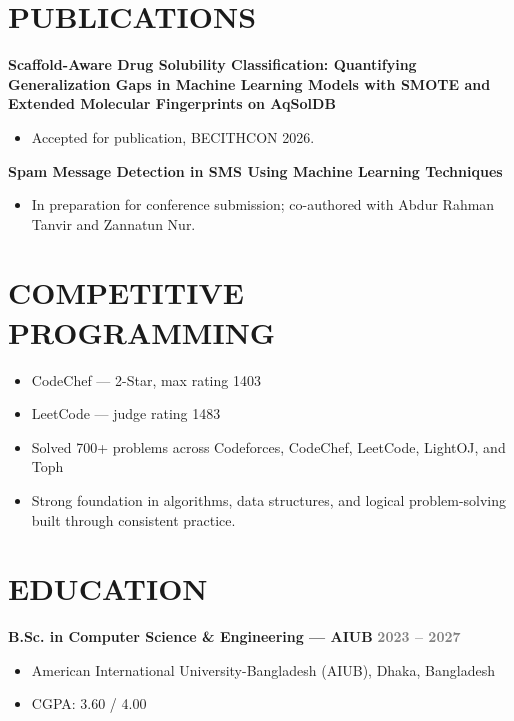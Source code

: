 \documentclass[9pt]{article}
\newenvironment{tightlist}{\begin{itemize}[leftmargin=13pt, itemsep=0pt, topsep=0pt, parsep=0pt]}{\end{itemize}}
\newcommand{\entry}[2]{%
  \textbf{#1} \hfill \textbf{\textcolor{graytext}{#2}}\par
}
\begin{document}
\section*{PUBLICATIONS}

\textbf{Scaffold-Aware Drug Solubility Classification: Quantifying Generalization Gaps in Machine Learning Models with SMOTE and Extended Molecular Fingerprints on AqSolDB}
\begin{tightlist}
  \item Accepted for publication, BECITHCON 2026.
\end{tightlist}

\textbf{Spam Message Detection in SMS Using Machine Learning Techniques}
\begin{tightlist}
  \item In preparation for conference submission; co-authored with Abdur Rahman Tanvir and Zannatun Nur.
\end{tightlist}

\section*{COMPETITIVE PROGRAMMING}
\begin{tightlist}
  \item CodeChef --- 2-Star, max rating 1403
  \item LeetCode --- judge rating 1483
  \item Solved 700+ problems across Codeforces, CodeChef, LeetCode, LightOJ, and Toph
  \item Strong foundation in algorithms, data structures, and logical problem-solving built through consistent practice.
\end{tightlist}

\section*{EDUCATION}

\entry{B.Sc. in Computer Science \& Engineering --- AIUB}{2023 -- 2027}
\begin{tightlist}
  \item American International University-Bangladesh (AIUB), Dhaka, Bangladesh
  \item CGPA: 3.60 / 4.00
\end{tightlist}
\end{document}
